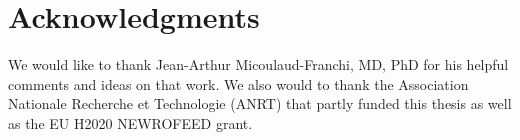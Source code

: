 
\section*{Acknowledgments}

We would like to thank Jean-Arthur Micoulaud-Franchi, MD, PhD for his helpful 
comments and ideas on that work. We also would to thank the Association Nationale 
Recherche et Technologie (ANRT) that partly funded this thesis as well as the EU 
H2020 NEWROFEED grant.

